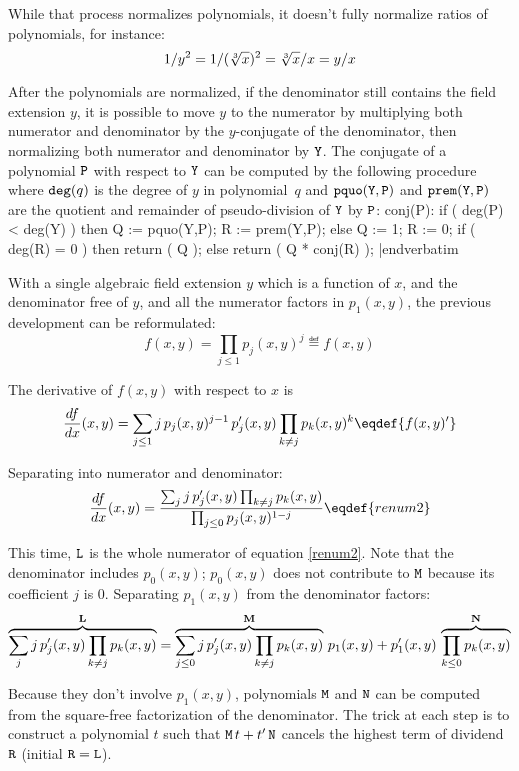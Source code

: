 While that process normalizes polynomials, it doesn't fully normalize
ratios of polynomials, for instance:
$$1/y^2=1/(\root3\of{x})^2=\root3\of{x}/x=y/x$$

After the polynomials are normalized, if the denominator still
contains the field extension $y$, it is possible to move $y$ to
the numerator by multiplying both numerator and denominator by the
$y$-conjugate of the denominator, then normalizing both numerator and
denominator by ${\tt{Y}}$.  The conjugate of a polynomial ${\tt{P}}$
with respect to ${\tt{Y}}$ can be computed by the following procedure
where ${\tt{deg}}(q)$ is the degree of $y$ in polynomial~$q$ and
${\tt{pquo(Y,P)}}$ and ${\tt{prem(Y,P)}}$ are the quotient and
remainder of pseudo-division of ${\tt{Y}}$ by ${\tt{P}}$:
\medskip
\verbatim
  conj(P):
    if ( deg(P) < deg(Y) ) then
      Q := pquo(Y,P);
      R := prem(Y,P);
    else
      Q := 1;
      R := 0;
    if ( deg(R) = 0 )
      then return ( Q );
      else return ( Q * conj(R) );
|endverbatim
\medskip

With a single algebraic field extension $y$ which is a function of
$x$, and the denominator free of $y$, and all the numerator factors in
$p_1(x,y)$, the previous development can be reformulated:
$$f(x,y)=\prod_{j\le1}p_j(x,y)^j\eqdef{f(x,y)}$$

The derivative of $f(x,y)$ with respect to $x$ is
$${d{f}\over d{x}}(x,y)=\sum_{j\le1}j\,p_j(x,y)^{j-1}\,{p_j'}(x,y)\prod_{k\neq j}p_k(x,y)^k
  \eqdef{f(x,y)'}$$

Separating into numerator and denominator:
$${d{f}\over d{x}}(x,y)
 ={\sum_jj\,{p_j'}(x,y)\prod_{k\neq j}p_k(x,y)
 \over\prod_{j\le0}p_j(x,y)^{1-j}}
\eqdef{renum2}$$

This time, ${\tt{L}}$ is the whole numerator of
equation \eqref{renum2}.  Note that the denominator includes
$p_0(x,y)$; $p_0(x,y)$ does not contribute to ${\tt{M}}$ because its
coefficient $j$ is 0.  Separating $p_1(x,y)$ from the denominator
factors:
$$\overbrace{\sum_jj\,{p_j'}(x,y)\prod_{k\neq j} p_k(x,y)}^{\bf L}=
  \overbrace{\sum_{j\le0}j\,{p_j'}(x,y)\prod_{k\neq j}p_k(x,y)}^{{\bf M}}\,p_1(x,y)
  +{p_1'}(x,y)\,\overbrace{\prod_{k\le0}p_k(x,y)}^{{\bf N}}$$

Because they don't involve $p_1(x,y)$, polynomials ${\tt{M}}$ and
${\tt{N}}$ can be computed from the square-free factorization of the
denominator.  The trick at each step is to construct a polynomial
$t$ such that ${\tt{M}}\,t+t'\,{\tt{N}}$ cancels the
highest term of dividend ${\tt{R}}$ (initial ${\tt{R}}={\tt{L}}$).

